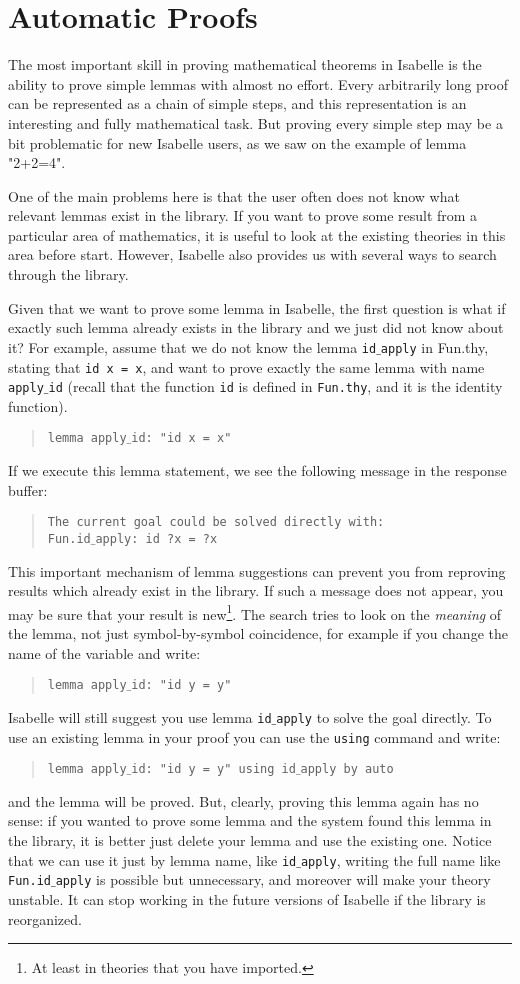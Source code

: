 \documentclass[11pt]{article}
\newcommand{\prog}[1]{\par\noindent\begin{quote}#1\end{quote}\par\noindent}
\begin{document}
\section{Automatic Proofs}

The most important skill in proving mathematical theorems in Isabelle is the ability to prove simple lemmas with almost no effort. Every arbitrarily long proof can be represented as a chain of simple steps, and this representation is an interesting and fully mathematical task. But proving every simple step may be a bit problematic for new Isabelle users, as we saw on the example of lemma "2+2=4".

One of the main problems here is that the user often does not know what relevant lemmas exist in the library. If you want to prove some result from a particular area of mathematics, it is useful to look at the existing theories in this area before start. However, Isabelle also provides us with several ways to search through the library.

Given that we want to prove some lemma in Isabelle, the first question is what if exactly such lemma already exists in the library and we just did not know about it? For example, assume that we do not know the lemma {\tt id$\_$apply} in Fun.thy, stating that {\tt id x = x}, and want to prove exactly the same lemma with name {\tt apply$\_$id} (recall that the function {\tt id} is defined in {\tt Fun.thy}, and it is the identity function).

\prog{\tt lemma apply$\_$id: "id x = x"}%

If we execute this lemma statement, we see the following message in the response buffer:

\prog{\tt The current goal could be solved directly with:\\
    Fun.id$\_$apply: id ?x = ?x}%

This important mechanism of lemma suggestions can prevent you from reproving results which already exist in the library. If such a message does not appear, you may be sure that your result is new\footnote{At least in theories that you have imported.}. The search tries to look on the \emph{meaning} of the lemma, not just symbol-by-symbol coincidence, for example if you change the name of the variable and write:
\prog{\tt lemma apply$\_$id: "id y = y"}%
Isabelle will still suggest you use lemma {\tt id$\_$apply} to solve the goal directly. To use an existing lemma in your proof you can use the {\tt using} command and write:

\prog{\tt lemma apply$\_$id: "id y = y" using id$\_$apply by auto}%
and the lemma will be proved. But, clearly, proving this lemma again has no sense: if you wanted to prove some lemma and the system found this lemma in the library, it is better just delete your lemma and use the existing one. Notice that we can use it just by lemma name, like {\tt id$\_$apply}, writing the full name like {\tt Fun.id$\_$apply} is possible but unnecessary, and moreover will make your theory unstable. It can stop working in the future versions of Isabelle if the library is reorganized.
\end{document}
